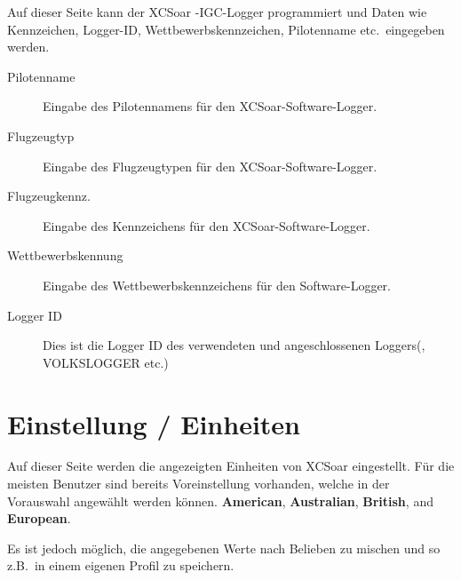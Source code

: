 Auf dieser Seite kann der \textsf{XCSoar} -IGC-Logger programmiert  und Daten wie Kennzeichen, Logger-ID, Wettbewerbskennzeichen, Pilotenname etc.\ eingegeben werden.
\begin{description}
\item[Pilotenname]  Eingabe des Pilotennamens für den \textsf{XCSoar}-Software-Logger.
\item[Flugzeugtyp]  Eingabe des Flugzeugtypen für den \textsf{XCSoar}-Software-Logger.
\item[Flugzeugkennz.]  Eingabe des Kennzeichens für den \textsf{XCSoar}-Software-Logger.
\item[Wettbewerbskennung] Eingabe des Wettbewerbskennzeichens für den Software-Logger.
\item[Logger ID]  Dies ist die Logger ID des verwendeten und angeschlossenen Loggers(\fl, VOLKSLOGGER etc.)
\end{description}

\section{Einstellung / Einheiten}

Auf dieser Seite werden die angezeigten Einheiten von \textsf{XCSoar} eingestellt.
Für die meisten Benutzer sind bereits Voreinstellung vorhanden, welche in der Vorauswahl angewählt werden können.
{\bf American}, {\bf Australian}, {\bf British}, and {\bf European}.

Es ist jedoch möglich, die angegebenen Werte nach Belieben zu mischen und so z.B.\ in einem eigenen Profil zu speichern.

